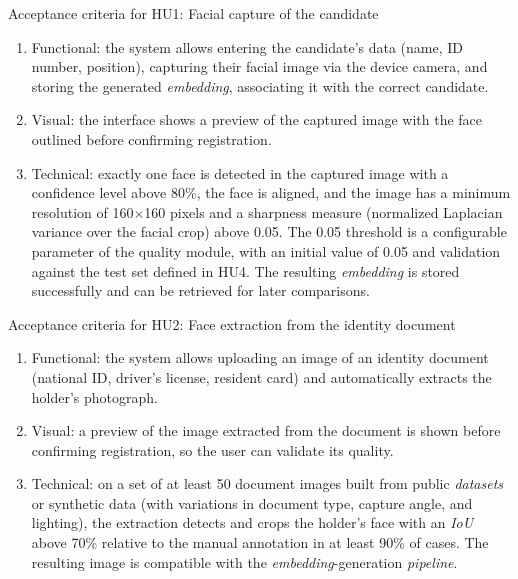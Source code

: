 \documentclass[
  11pt, %
]{charter}
\begin{document}
Acceptance criteria for HU1: Facial capture of the candidate
\begin{enumerate}
  \item Functional: the system allows entering the candidate's data (name, ID number, position), capturing their facial image via the device camera, and storing the generated \textit{embedding}, associating it with the correct candidate.
  \item Visual: the interface shows a preview of the captured image with the face outlined before confirming registration.
  \item Technical: exactly one face is detected in the captured image with a confidence level above 80\%, the face is aligned, and the image has a minimum resolution of 160$\times$160 pixels and a sharpness measure (normalized Laplacian variance over the facial crop) above 0.05. The 0.05 threshold is a configurable parameter of the quality module, with an initial value of 0.05 and validation against the test set defined in HU4. The resulting \textit{embedding} is stored successfully and can be retrieved for later comparisons.
\end{enumerate}

Acceptance criteria for HU2: Face extraction from the identity document
\begin{enumerate}
  \item Functional: the system allows uploading an image of an identity document (national ID, driver's license, resident card) and automatically extracts the holder's photograph.
  \item Visual: a preview of the image extracted from the document is shown before confirming registration, so the user can validate its quality.
  \item Technical: on a set of at least 50 document images built from public \textit{datasets} or synthetic data (with variations in document type, capture angle, and lighting), the extraction detects and crops the holder's face with an \textit{IoU} above 70\% relative to the manual annotation in at least 90\% of cases. The resulting image is compatible with the \textit{embedding}-generation \textit{pipeline}.
\end{enumerate}
\end{document}
